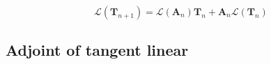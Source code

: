 \begin{equation}
\mathcal{L}(\mathbf{T}_{n+1}) = \mathcal{L}(\mathbf{A}_{n})\mathbf{T}_{n} + \mathbf{A}_{n}\mathcal{L}(\mathbf{T}_{n})
\label{eq:doubling-tangent_linear-T_l}
\end{equation}


%
\subsection{Adjoint of tangent linear}
\label{sec:doubling-adjoint_of_tangent_linear}
